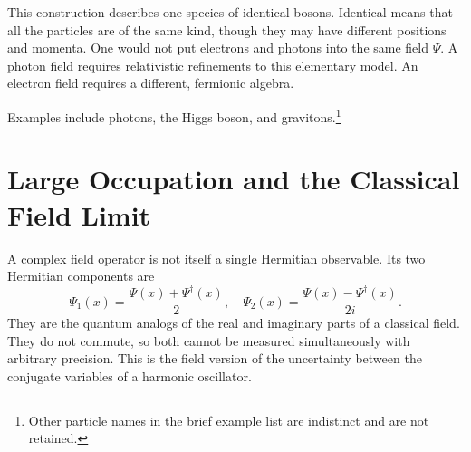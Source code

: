 This construction describes one species of identical bosons. Identical means that all the particles are of the same kind, though they may have different positions and momenta. One would not put electrons and photons into the same field \(\Psi\). A photon field requires relativistic refinements to this elementary model. An electron field requires a different, fermionic algebra.

\begin{classroomqa}
\end{classroomqa}


Examples include photons, the Higgs boson, and gravitons.\footnote{Other particle names in the brief example list are indistinct and are not retained.}

\section{Large Occupation and the Classical Field Limit}

A complex field operator is not itself a single Hermitian observable. Its two Hermitian components are
\begin{equation}
\Psi_1(x)=\frac{\Psi(x)+\Psi^\dagger(x)}{2},
\quad
\Psi_2(x)=\frac{\Psi(x)-\Psi^\dagger(x)}{2i}.
\end{equation}
They are the quantum analogs of the real and imaginary parts of a classical field. They do not commute, so both cannot be measured simultaneously with arbitrary precision. This is the field version of the uncertainty between the conjugate variables of a harmonic oscillator.

